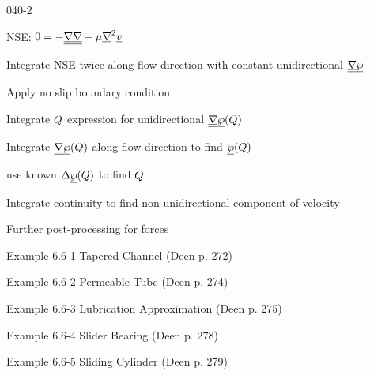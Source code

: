 \begin{mitframe}{040-2}

                
\begin{listone}
\item NSE: $0=-\uline{\gradop}\uline{\gradop}+\chempot\gradop^2\uline{\vvel}$

			\begin{listtwo}
            \item Integrate NSE twice along flow direction with constant unidirectional $\uline{\gradop}\uline{\dynpress}$
            
            \item Apply no slip boundary condition
            
            \item Integrate $\heatflow$ expression for unidirectional $\uline{\gradop}\uline{\dynpress}(\heatflow)$
            
            \item Integrate $\uline{\gradop}\uline{\dynpress}(\heatflow)$ along flow direction to find $\uline{\dynpress}(\heatflow)$
            
            \item use known $\iipf\uline{\dynpress}(\heatflow)$ to find $\heatflow$
            
            \item Integrate continuity to find non-unidirectional component of velocity
            
            \item Further post-processing for forces
                       
\end{listtwo}

\item Example 6.6-1 Tapered Channel (Deen p. 272)
\item Example 6.6-2 Permeable Tube (Deen p. 274)
\item Example 6.6-3 Lubrication Approximation (Deen p. 275)
\item Example 6.6-4 Slider Bearing (Deen p. 278)
\item Example 6.6-5 Sliding Cylinder (Deen p. 279)

\end{listone}
\end{mitframe}